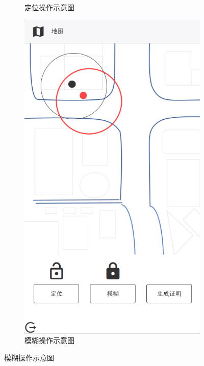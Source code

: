\documentclass[zihao=-4]{ctexart}
\begin{document}
\begin{figure}[htbp]
\begin{subfigure}{0.31\textwidth}
    \caption{定位操作示意图} 
  \end{subfigure}%
  \hspace*{\fill}   %
  \begin{subfigure}{0.31\textwidth}
    \includegraphics[width=\linewidth]{前端-模糊.jpg}
    \caption{模糊操作示意图} 
  \end{subfigure}
  \hspace*{\fill}   %

\end{figure}
\end{document}
